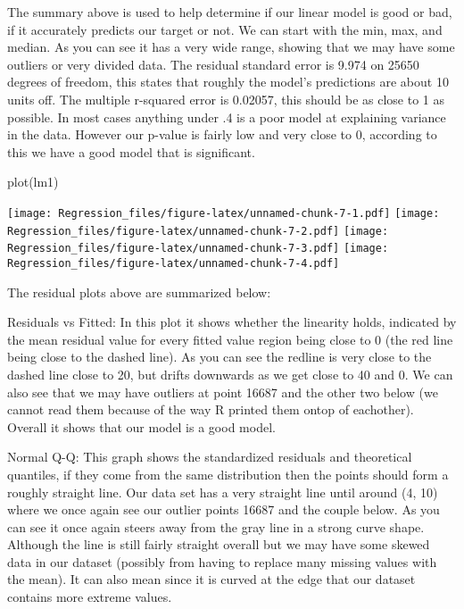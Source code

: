 \documentclass[
]{article}
\newenvironment{Shaded}{\begin{snugshade}}{\end{snugshade}}
\newcommand{\FunctionTok}[1]{\textcolor[rgb]{0.00,0.00,0.00}{#1}}
\newcommand{\NormalTok}[1]{#1}
\begin{document}
The summary above is used to help determine if our linear model is good
or bad, if it accurately predicts our target or not. We can start with
the min, max, and median. As you can see it has a very wide range,
showing that we may have some outliers or very divided data. The
residual standard error is 9.974 on 25650 degrees of freedom, this
states that roughly the model's predictions are about 10 units off. The
multiple r-squared error is 0.02057, this should be as close to 1 as
possible. In most cases anything under .4 is a poor model at explaining
variance in the data. However our p-value is fairly low and very close
to 0, according to this we have a good model that is significant.

\begin{Shaded}
\begin{Highlighting}[]
\FunctionTok{plot}\NormalTok{(lm1)}
\end{Highlighting}
\end{Shaded}

\texttt{[image: Regression\_files/figure-latex/unnamed-chunk-7-1.pdf]}
\texttt{[image: Regression\_files/figure-latex/unnamed-chunk-7-2.pdf]}
\texttt{[image: Regression\_files/figure-latex/unnamed-chunk-7-3.pdf]}
\texttt{[image: Regression\_files/figure-latex/unnamed-chunk-7-4.pdf]}

The residual plots above are summarized below:

Residuals vs Fitted: In this plot it shows whether the linearity holds,
indicated by the mean residual value for every fitted value region being
close to 0 (the red line being close to the dashed line). As you can see
the redline is very close to the dashed line close to 20, but drifts
downwards as we get close to 40 and 0. We can also see that we may have
outliers at point 16687 and the other two below (we cannot read them
because of the way R printed them ontop of eachother). Overall it shows
that our model is a good model.

Normal Q-Q: This graph shows the standardized residuals and theoretical
quantiles, if they come from the same distribution then the points
should form a roughly straight line. Our data set has a very straight
line until around (4, 10) where we once again see our outlier points
16687 and the couple below. As you can see it once again steers away
from the gray line in a strong curve shape. Although the line is still
fairly straight overall but we may have some skewed data in our dataset
(possibly from having to replace many missing values with the mean). It
can also mean since it is curved at the edge that our dataset contains
more extreme values.
\end{document}
